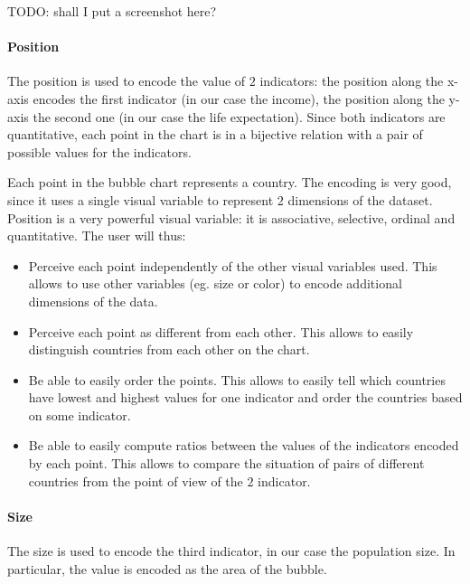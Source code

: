 \vspace{0.5cm}
TODO: shall I put a screenshot here?


\paragraph{Position}
The position is used to encode the value of $2$ indicators: the position along the x-axis encodes the first indicator (in our case the income), the position along the y-axis the second one (in our case the life expectation).
Since both indicators are quantitative, each point in the chart is in a bijective relation with a pair of possible values for the indicators.

Each point in the bubble chart represents a country.
The encoding is very good, since it uses a single visual variable to represent $2$ dimensions of the dataset.
Position is a very powerful visual variable: it is associative, selective, ordinal and quantitative.
The user will thus:
\begin{itemize}
    \item Perceive each point independently of the other visual variables used. This allows to use other variables (eg. size or color) to encode additional dimensions of the data.
    \item Perceive each point as different from each other. This allows to easily distinguish countries from each other on the chart.
    \item Be able to easily order the points. This allows to easily tell which countries have lowest and highest values for one indicator and order the countries based on some indicator.
    \item Be able to easily compute ratios between the values of the indicators encoded by each point. This allows to compare the situation of pairs of different countries from the point of view of the $2$ indicator.
\end{itemize}



\paragraph{Size}
The size is used to encode the third indicator, in our case the population size.
In particular, the value is encoded as the area of the bubble.

